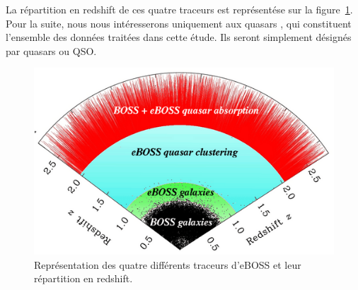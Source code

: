 La répartition en redshift de ces quatre traceurs est représentése sur la figure~\ref{fig:eBOSStracers}.
Pour la suite, nous nous intéresserons uniquement aux quasars \lya{}, qui constituent l'ensemble des données traitées dans cette étude. Ils seront simplement désignés par quasars ou QSO.

\begin{figure}
  \centering
  \includegraphics[scale=0.5]{eBOSStracers}
  \caption{Représentation des quatre différents traceurs d'eBOSS et leur r\'epartition en redshift.}
  \label{fig:eBOSStracers}
\end{figure}
\paragraph{}





